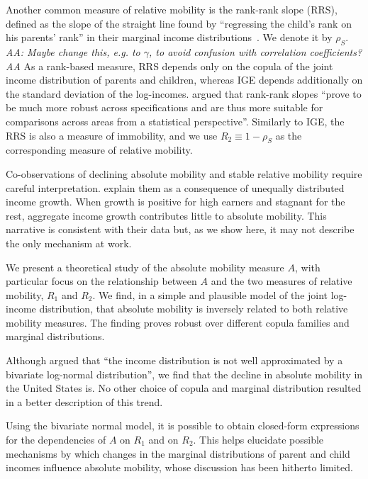 \documentclass[12pt,a4paper]{article}
\newcommand{\red}[1]{{\color{red} #1}}
\newcommand{\AAA}[1]{\red{{\it AA: #1 AA}}}
\numberwithin{equation}{section}
\begin{document}
Another common measure of relative mobility is the rank-rank slope (RRS), defined as the slope of the straight line found by ``regressing the child's rank on his parents' rank'' in their marginal income distributions~\citep[p.~1561]{chetty2014land}. We denote it by $\rho_S$. \AAA{Maybe change this, e.g. to $\gamma$, to avoid confusion with correlation coefficients?} As a rank-based measure, RRS depends only on the copula of the joint income distribution of parents and children, whereas IGE depends additionally on the standard deviation of the log-incomes. \citet[p.~1561]{chetty2014land} argued that rank-rank slopes ``prove to be much more robust across specifications and are thus more suitable for comparisons across areas from a statistical perspective''. Similarly to IGE, the RRS is also a measure of immobility, and we use $R_2 \equiv 1-\rho_S$ as the corresponding measure of relative mobility.

Co-observations of declining absolute mobility and stable relative mobility require careful interpretation. \citet{chetty2017fading} explain them as a consequence of unequally distributed income growth. When growth is positive for high earners and stagnant for the rest, aggregate income growth contributes little to absolute mobility. This narrative is consistent with their data but, as we show here, it may not describe the only mechanism at work.

We present a theoretical study of the absolute mobility measure $A$, with particular focus on the relationship between $A$ and the two measures of relative mobility, $R_1$ and $R_2$. We find, in a simple and plausible model of the joint log-income distribution, that absolute mobility is inversely related to both relative mobility measures. The finding proves robust over different copula families and marginal distributions.

Although \citet[p.~1574]{chetty2014land} argued that ``the income distribution is not well approximated by a bivariate log-normal distribution'', we find that the decline in absolute mobility in the United States is. No other choice of copula and marginal distribution resulted in a better description of this trend.

Using the bivariate normal model, it is possible to obtain closed-form expressions for the dependencies of $A$ on $R_1$ and on $R_2$. This helps elucidate possible mechanisms by which changes in the marginal distributions of parent and child incomes influence absolute mobility, whose discussion has been hitherto limited.
\end{document}
